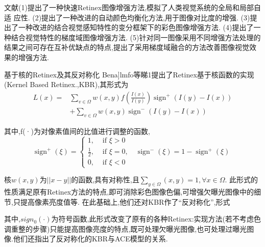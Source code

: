 \message{ !name(main.tex)}\documentclass{amsart}
\begin{document}
文献\cite{许欣}(1)提出了一种快速Retinex图像增强方法,模拟了人类视觉系统的全局和局部自适
应性.
(2)提出了一种改进的自动颜色均衡化方法,用于图像对比度的增强.
(3)提出了一种改进的结合视觉感知特性的变分框架下的彩色图像增强方法.
(4)提出了一种结合视觉特性的梯度域图像增强方法.
(5)针对同一图像采用不同增强方法处理的结果之间可存在互补优缺点的特点,提出了采用梯度域融合的方法改善图像视觉效果的增强方法.


基于核的Retinex及其反对称化
Bena]lmfo等睇1提出了Retinex基于核函数的实现(Kernel Based Retinex.,KBR),其形式为
\begin{equation}
  \label{eq:08}
\begin{aligned}
L(x)=& \sum_{v \in \Omega} w(x, y) f\left(\frac{I(x)}{I(y)}\right) \operatorname{sign}^{+}(I(y)-I(x)) \\
&+\sum_{v \in \Omega} w(x, y) \operatorname{sign}^{-}(I(y)-I(x))
\end{aligned}
\end{equation}

其中,f(·)为对像素值间的比值进行调整的函数,
\begin{equation}
  \label{eq:09}
\operatorname{sign}^{+}(\xi)=\left\{\begin{array}{ll}
1, & \text { if } \xi>0 \\
\frac{1}{2}, & \text { if } \xi=0, \quad \operatorname{sign}^{-}(\xi)=1-\operatorname{sign}^{+}(\xi) \\
0, & \text { if } \xi<0
\end{array}\right.
\end{equation}

核$w(x,y)$为$||x-y||$的函数,具有对称性,且$\sum_{y\in \Omega}(x,y)=1,\forall x \in \Omega$.
此形式的性质满足原有Retinex方法的特点,即可消除彩色图像色偏,可增强欠曝光图像中的细节,只提高像素亮度值等.
在此基础上,他们还对KBR作了“反对称化”,形式


其中,$sign_{0}(·)$为符号函数,此形式改变了原有的各种Retinex:实现方法(若不考虑色调重整的步骤)只能提高图像亮度的特点,既可处理欠曝光图像,也可处理过曝光图像.他们还指出了反对称化的KBR与ACE模型的关系.
\end{document}
